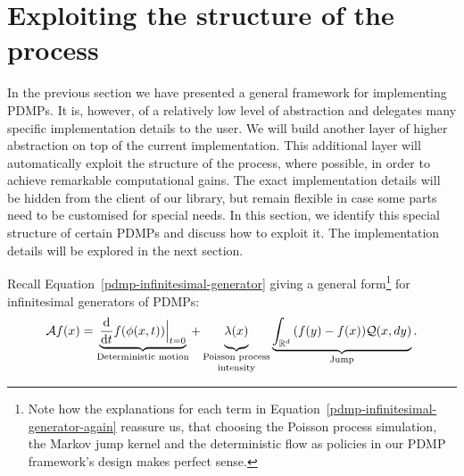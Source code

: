 \documentclass[report.tex]{subfiles}
\begin{document}
\section{Exploiting the structure of the process}
\label{exploiting-structure-of-pdmp}

In the previous section we have presented a general framework for implementing
PDMPs.
It is, however, of a relatively low level of abstraction and delegates many specific
implementation details to the user.
We will build another layer
of higher abstraction on top of the current implementation.
This additional layer will automatically exploit the structure of the process,
where possible, in order to achieve remarkable computational gains.
The exact implementation details will be hidden from the client of our library,
but remain flexible in case some parts need to be customised for special needs.
In this section, we identify this special structure of certain PDMPs
and discuss how to exploit it.
The implementation details will be explored in the next section.

Recall Equation~\ref{pdmp-infinitesimal-generator} giving a general form\footnote{
Note how the explanations for each term in Equation~\ref{pdmp-infinitesimal-generator-again}
reassure us, that
choosing the Poisson process simulation, the Markov jump kernel and the deterministic
flow as policies in our PDMP framework's design makes perfect sense.
} for infinitesimal generators of PDMPs:
\begin{equation}
  \label{pdmp-infinitesimal-generator-again}
  \mathcal{A}f(x) =
  \underbrace{\dv{}{t}f(\phi(x, t)) \Bigr|_{t = 0}}_\text{Deterministic motion} +
  \underbrace{\lambda(x)\vphantom{\Bigr|_{t=0}}}_\text{\shortstack{Poisson process \\ intensity}}
  \underbrace{\myintNoVariable{\mathbb{R}^{d}}{}{}{(f(y) - f(x))\mathcal{Q}(x, dy)}}_\text{Jump}.
\end{equation}
\end{document}
